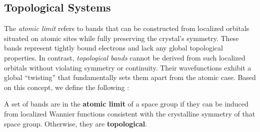%

%

\subsection{Topological Systems}

The \textit{atomic limit} refers to bands that can be constructed from localized orbitals situated on atomic sites while fully preserving the crystal's symmetry. These bands represent tightly bound electrons and lack any global topological properties. In contrast, \textit{topological bands} cannot be derived from such localized orbitals without violating symmetry or continuity. Their wavefunctions exhibit a global ``twisting'' that fundamentally sets them apart from the atomic case. Based on this concept, we define the following \cite{building_blocks2018}:

\begin{definition}
A set of bands are in the \textbf{atomic limit} of a space group if they can be induced from localized Wannier functions consistent with the crystalline symmetry of that space group. Otherwise, they are \textbf{topological}.
\end{definition}


